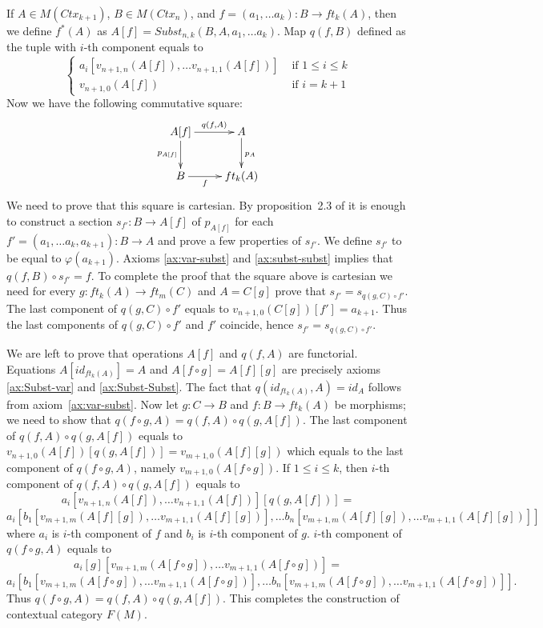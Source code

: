 \documentclass[reqno]{amsart}
\theoremstyle{definition}
\theoremstyle{remark}
\numberwithin{figure}{section}
\begin{document}
If $A \in M(Ctx_{k+1})$, $B \in M(Ctx_n)$, and $f = (a_1, \ldots a_k) : B \to ft_k(A)$, then we define $f^*(A)$ as $A[f] = Subst_{n,k}(B, A, a_1, \ldots a_k)$.
Map $q(f,B)$ defined as the tuple with $i$-th component equals to
\[ \left\{
  \begin{array}{lr}
    a_i[v_{n+1,n}(A[f]), \ldots v_{n+1,1}(A[f])] & \text{ if } 1 \leq i \leq k \\
    v_{n+1,0}(A[f])                              & \text{ if } i = k+1
  \end{array}
\right. \]
Now we have the following commutative square:
\[ \xymatrix{ A[f] \ar[r]^-{q(f,A)} \ar[d]_{p_{A[f]}} & A \ar[d]^{p_A} \\
              B \ar[r]_-f                             & ft_k(A)
            } \]
We need to prove that this square is cartesian.
By proposition~2.3 of \cite{c-systems} it is enough to construct a section $s_{f'} : B \to A[f]$ of $p_{A[f]}$ for each $f' = (a_1, \ldots a_k, a_{k+1}) : B \to A$ and prove a few properties of $s_{f'}$.
We define $s_{f'}$ to be equal to $\varphi(a_{k+1})$.
Axioms \eqref{ax:var-subst} and \eqref{ax:subst-subst} implies that $q(f, B) \circ s_{f'} = f$.
To complete the proof that the square above is cartesian we need for every $g : ft_k(A) \to ft_m(C)$ and $A = C[g]$ prove that $s_{f'} = s_{q(g,C) \circ f'}$.
The last component of $q(g,C) \circ f'$ equals to $v_{n+1,0}(C[g])[f'] = a_{k+1}$.
Thus the last components of $q(g,C) \circ f'$ and $f'$ coincide, hence $s_{f'} = s_{q(g,C) \circ f'}$.

We are left to prove that operations $A[f]$ and $q(f,A)$ are functorial.
Equations $A[id_{ft_k(A)}] = A$ and $A[f \circ g] = A[f][g]$ are precisely axioms \eqref{ax:Subst-var} and \eqref{ax:Subst-Subst}.
The fact that $q(id_{ft_k(A)}, A) = id_A$ follows from axiom~\ref{ax:var-subst}.
Now let $g : C \to B$ and $f : B \to ft_k(A)$ be morphisms; we need to show that $q(f \circ g, A) = q(f,A) \circ q(g,A[f])$.
The last component of $q(f,A) \circ q(g,A[f])$ equals to $v_{n+1,0}(A[f])[q(g,A[f])] = v_{m+1,0}(A[f][g])$ which equals to the last component of $q(f \circ g, A)$, namely $v_{m+1,0}(A[f \circ g])$.
If $1 \leq i \leq k$, then $i$-th component of $q(f,A) \circ q(g,A[f])$ equals to
\[ a_i[v_{n+1,n}(A[f]), \ldots v_{n+1,1}(A[f])][q(g,A[f])] = \]
\[ a_i[b_1[v_{m+1,m}(A[f][g]), \ldots v_{m+1,1}(A[f][g])], \ldots b_n[v_{m+1,m}(A[f][g]), \ldots v_{m+1,1}(A[f][g])]] \]
where $a_i$ is $i$-th component of $f$ and $b_i$ is $i$-th component of $g$.
$i$-th component of $q(f \circ g, A)$ equals to
\[ a_i[g][v_{m+1,m}(A[f \circ g]), \ldots v_{m+1,1}(A[f \circ g])] = \]
\[ a_i[b_1[v_{m+1,m}(A[f \circ g]), \ldots v_{m+1,1}(A[f \circ g])], \ldots b_n[v_{m+1,m}(A[f \circ g]), \ldots v_{m+1,1}(A[f \circ g])]]. \]
Thus $q(f \circ g, A) = q(f,A) \circ q(g,A[f])$.
This completes the construction of contextual category $F(M)$.
\end{document}
